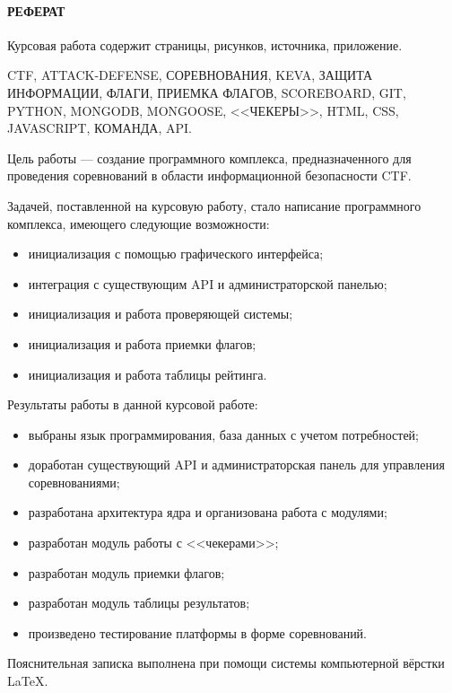 \newpage
{}
\paragraph{\hfill РЕФЕРАТ \hfill}
Курсовая работа содержит  страницы,  рисунков,  источника,  приложение.

CTF, ATTACK-DEFENSE, СОРЕВНОВАНИЯ, KEVA, ЗАЩИТА ИНФОРМАЦИИ, ФЛАГИ, ПРИЕМКА ФЛАГОВ, SCOREBOARD, GIT, PYTHON, MONGODB, MONGOOSE, <<ЧЕКЕРЫ>>, HTML, CSS, JAVASCRIPT, КОМАНДА, API.

Цель работы --- создание программного комплекса, предназначенного для проведения соревнований в области информационной безопасности CTF.

Задачей, поставленной на курсовую работу, стало написание программного комплекса, имеющего следующие возможности: 
\begin{itemize}
\item инициализация с помощью графического интерфейса;
\item интеграция с существующим API и администраторской панелью; 
\item инициализация и работа проверяющей системы;
\item инициализация и работа приемки флагов;
\item инициализация и работа таблицы рейтинга.
\end{itemize}

Результаты работы в данной курсовой работе:

\begin{itemize}
\item выбраны язык программирования, база данных с учетом потребностей;
\item доработан существующий API и администраторская панель для управления соревнованиями; 
\item разработана архитектура ядра и организована работа с модулями;
\item разработан модуль работы с <<чекерами>>;
\item разработан модуль приемки флагов;
\item разработан модуль таблицы результатов;
\item произведено тестирование платформы в форме соревнований.
\end{itemize}

Пояснительная записка выполнена при помощи системы компьютерной вёрстки \LaTeX.
